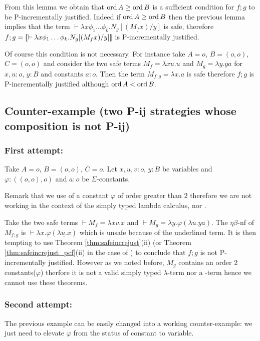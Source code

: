 From this lemma we obtain that $\mathop{\mathrm{ord}}{A}\geq\mathop{\mathrm{ord}}{B}$ is
a sufficient condition for $f;g$ to be P-incrementally justified.
Indeed if $\mathop{\mathrm{ord}}{A}\geq\mathop{\mathrm{ord}}{B}$ then the previous lemma implies that the term $\vdash \lambda x \phi_1 \dots \phi_k. N_g [(M_f x) / y]$
is safe, therefore $f;g = {[\![ \vdash \lambda x \phi_1 \dots \phi_k. N_g [(M_f x) / y] ]\!]}$
is P-incrementally justified.


Of course this condition is not necessary. For instance take $A=o$, $B=(o,o)$, $C=(o,o)$ and consider the two safe terms $M_f = \lambda x u.u$ and $M_g = \lambda y . y a$ for $x,u:o$, $y:B$ and constants $a:o$. Then the term $M_{f;g} = \lambda x . a$ is safe therefore $f;g$ is P-incrementally justified although $\mathop{\mathrm{ord}}{A} < \mathop{\mathrm{ord}}{B}$.





\subsection{Counter-example (two P-ij strategies whose composition is not P-ij)}
\subsubsection{First attempt:}

Take $A=o$, $B=(o,o)$, $C=o$. Let $x,u,v:o$, $y:B$ be variables and $\varphi:((o,o),o)$ and $a:o$ be $\Sigma$-constants.

Remark that we use of a constant $\varphi$ of order greater than $2$ therefore we are not working in the context of the simply typed lambda calculus, nor \pcf.

Take the two safe terms $\vdash  M_f = \lambda xv.x$ and $\vdash M_g = \lambda y . \varphi (\lambda u . y a)$.
The $\eta\beta$-nf of $M_{f;g}$ is $\vdash \lambda x . \varphi (\underline{\lambda u . x})$ which is unsafe because of the underlined term. It is then tempting to use
Theorem \ref{thm:safeincrejust}(ii) (or Theorem \ref{thm:safeincrejust_pcf}(ii) in the case of \pcf) to conclude that
$f;g$ is not P-incrementally justified. However as we noted before, $M_g$ contains an order $2$ constants($\varphi$) therfore it is not a valid simply typed $\lambda$-term nor a \pcf-term hence we cannot use these theorems.

\subsubsection{Second attempt:}
The previous example can be easily changed into a working counter-example: we just need to elevate $\varphi$ from the status of constant to variable.

